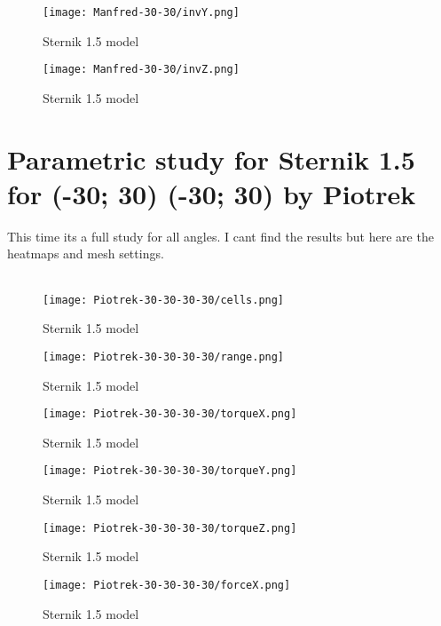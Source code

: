 \begin{figure}[H]
    \centering
    \texttt{[image: Manfred-30-30/invY.png]}
    \caption{Sternik 1.5 model}
\end{figure}

\begin{figure}[H]
    \centering
    \texttt{[image: Manfred-30-30/invZ.png]}
    \caption{Sternik 1.5 model}
\end{figure}
\newpage
\section{Parametric study for Sternik 1.5 for (-30; 30) (-30; 30) by Piotrek}
This time its a full study for all angles. I cant find the results but here are the heatmaps and 
mesh settings. \\\\

\begin{figure}[H]
    \centering
    \texttt{[image: Piotrek-30-30-30-30/cells.png]}
    \caption{Sternik 1.5 model}
\end{figure}

\begin{figure}[H]
    \centering
    \texttt{[image: Piotrek-30-30-30-30/range.png]}
    \caption{Sternik 1.5 model}
\end{figure}

\begin{figure}[H]
    \centering
    \texttt{[image: Piotrek-30-30-30-30/torqueX.png]}
    \caption{Sternik 1.5 model}
\end{figure}

\begin{figure}[H]
    \centering
    \texttt{[image: Piotrek-30-30-30-30/torqueY.png]}
    \caption{Sternik 1.5 model}
\end{figure}

\begin{figure}[H]
    \centering
    \texttt{[image: Piotrek-30-30-30-30/torqueZ.png]}
    \caption{Sternik 1.5 model}
\end{figure}

\begin{figure}[H]
    \centering
    \texttt{[image: Piotrek-30-30-30-30/forceX.png]}
    \caption{Sternik 1.5 model}
\end{figure}

